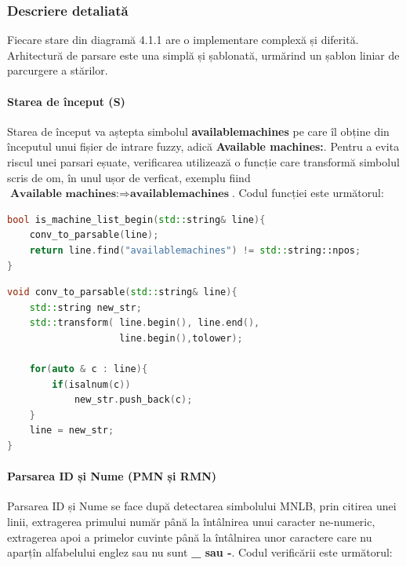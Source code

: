 \documentclass[12pt, twoside]{article}
\begin{document}
\setcounter{secnumdepth}{4}


\subsubsection{Descriere detaliată}

Fiecare stare din diagramă 4.1.1 are o implementare complexă
și diferită. Arhitectură de parsare este una simplă și 
șablonată, urmărind un șablon liniar de parcurgere a stărilor.

\paragraph{Starea de început (S)}

Starea de început va aștepta simbolul \textbf{availablemachines}
pe care îl obține din începutul unui fișier de intrare fuzzy, adică
\textbf{Available machines:}. Pentru a evita riscul unei parsari
eșuate, verificarea utilizează o funcție care transformă simbolul
scris de om, în unul ușor de verficat, exemplu fiind $\textbf{Available machines:}
\Rightarrow \textbf{availablemachines}$. Codul funcției este următorul:

\begin{lstlisting}[language={C++},breaklines,frame={single}]
bool is_machine_list_begin(std::string& line){
    conv_to_parsable(line);
    return line.find("availablemachines") != std::string::npos;
}
\end{lstlisting}

\pagebreak
\begin{lstlisting}[language={C++},breaklines,frame={single}]
void conv_to_parsable(std::string& line){
    std::string new_str;
    std::transform( line.begin(), line.end(),
                    line.begin(),tolower);

    for(auto & c : line){
        if(isalnum(c))
            new_str.push_back(c);
    }
    line = new_str;
}
\end{lstlisting}

\paragraph{Parsarea ID și Nume (PMN și RMN)}

Parsarea ID și Nume se face după detectarea simbolului
MNLB, prin citirea unei linii, extragerea primului număr
până la întâlnirea unui caracter ne-numeric, extragerea apoi
a primelor cuvinte până la întâlnirea unor caractere care nu
aparțîn alfabelului englez sau nu sunt \textbf{\_ sau -}.
Codul verificării este următorul:
\end{document}
